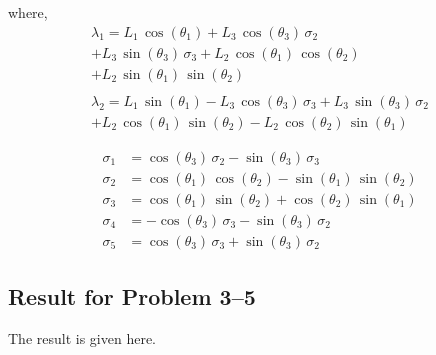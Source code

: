 \documentclass[conference]{IEEEtran}
\begin{document}
where,
\begin{multline*}
    \lambda_1 = L_1 \,\cos \left(\theta_1 \right)+L_3 \,\cos \left(\theta_3 \right)\,\sigma_2 \\+L_3 \,\sin \left(\theta_3 \right)\,\sigma_3 +L_2 \,\cos \left(\theta_1 \right)\,\cos \left(\theta_2 \right)\\+L_2 \,\sin \left(\theta_1 \right)\,\sin \left(\theta_2 \right)\\
    \\
    \lambda_2 = L_1 \,\sin \left(\theta_1 \right)-L_3 \,\cos \left(\theta_3 \right)\,\sigma_3 +L_3 \,\sin \left(\theta_3 \right)\,\sigma_2 \\+L_2 \,\cos \left(\theta_1 \right)\,\sin \left(\theta_2 \right)-L_2 \,\cos \left(\theta_2 \right)\,\sin \left(\theta_1 \right)
\end{multline*}

\begin{align*}
    \sigma_1 &=\cos \left(\theta_3 \right)\,\sigma_2 -\sin \left(\theta_3 \right)\,\sigma_3 \\
    \sigma_2 &=\cos \left(\theta_1 \right)\,\cos \left(\theta_2 \right)-\sin \left(\theta_1 \right)\,\sin \left(\theta_2 \right)\\
    \sigma_3 &=\cos \left(\theta_1 \right)\,\sin \left(\theta_2 \right)+\cos \left(\theta_2 \right)\,\sin \left(\theta_1 \right)\\
    \sigma_4 &= -\cos \left(\theta_3 \right)\,\sigma_3 -\sin \left(\theta_3 \right)\,\sigma_2\\
    \sigma_5 &= \cos \left(\theta_3 \right)\,\sigma_3 +\sin \left(\theta_3 \right)\,\sigma_2
\end{align*}

\subsection{Result for Problem 3--5}

The result is given here.
\end{document}
